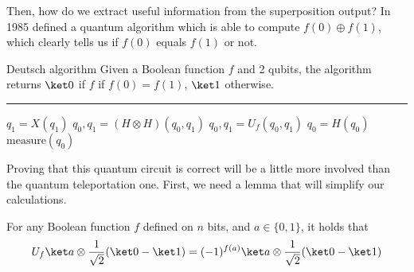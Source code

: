 \documentclass[a4paper, 12pt]{report}
\begin{document}
Then, how do we extract useful  information from the superposition output? In 1985 \textcite{deutsch} defined a quantum algorithm which is able to compute $f(0) \oplus f(1)$, which clearly tells us if $f(0)$ equals $f(1)$ or not.

\begin{framedalgo}{Deutsch algorithm}
    Given a Boolean function $f$ and 2 qubits, the algorithm returns $\ket 0$ if $f$ if $f(0) = f(1)$, $\ket 1$ otherwise. \\
    \hrule

    \quad
    \begin{algorithmic}[1]
            \State $q_1 = X(q_1)$
            \State $q_0, q_1 = (H \otimes H)(q_0, q_1)$
            \State $q_0, q_1 = U_f(q_0, q_1)$
            \State $q_0 = H(q_0)$
            \State {} $\mbox{measure}(q_0)$
        \EndFunction
    \end{algorithmic}
\end{framedalgo}


Proving that this quantum circuit is correct will be a little more involved than the quantum teleportation one. First, we need a lemma that will simplify our calculations.

\begin{framedlem}{}
    For any Boolean function $f$ defined on $n$ bits, and $a \in \{0, 1\}$, it holds that $$U_f \ket a \otimes \dfrac{1}{\sqrt 2}(\ket 0 - \ket 1) = (-1)^{f(a)} \ket a \otimes \dfrac{1}{\sqrt 2}(\ket 0 - \ket 1)$$
\end{framedlem}
\end{document}
